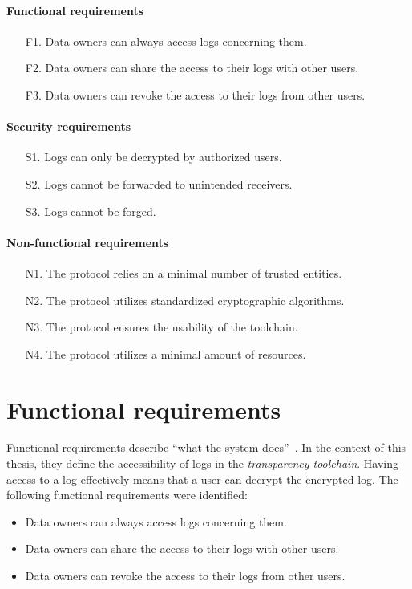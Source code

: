 \documentclass[../main.tex]{subfiles}
\begin{document}
\paragraph*{Functional requirements}
\begin{itemize}
    \item [F1.] Data owners can always access logs concerning them.
    \item [F2.] Data owners can share the access to their logs with other users.
    \item [F3.] Data owners can revoke the access to their logs from other users.
\end{itemize}

\paragraph{Security requirements}
\begin{itemize}
    \item [S1.] Logs can only be decrypted by authorized users.
    \item [S2.] Logs cannot be forwarded to unintended receivers.
    \item [S3.] Logs cannot be forged.
\end{itemize}

\paragraph{Non-functional requirements}
\begin{itemize}
    \item [N1.] The protocol relies on a minimal number of trusted entities.
    \item [N2.] The protocol utilizes standardized cryptographic algorithms.
    \item [N3.] The protocol ensures the usability of the toolchain.
    \item [N4.] The protocol utilizes a minimal amount of resources.
\end{itemize}

\section{Functional requirements}\label{functional-requriements}
Functional requirements describe \enquote{what the system does}~\cite[11]{Mylopoulos1992}.
In the context of this thesis, they define the accessibility of logs in the \emph{transparency toolchain}.
Having access to a log effectively means that a user can decrypt the encrypted log.
The following functional requirements were identified:
\begin{itemize}
    \item Data owners can always access logs concerning them.
    \item Data owners can share the access to their logs with other users.
    \item Data owners can revoke the access to their logs from other users.
\end{itemize}
\end{document}
